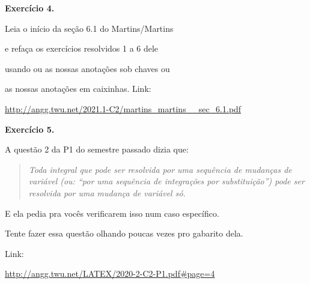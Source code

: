 \documentclass[oneside,12pt]{article}
\begin{document}
\bsk
\bsk


{\bf Exercício 4.}

Leia o início da seção 6.1 do Martins/Martins

e refaça os exercícios resolvidos 1 a 6 dele

usando ou as nossas anotações sob chaves ou

as nossas anotações em caixinhas. Link:

\ssk

{\scriptsize

\url{http://angg.twu.net/2021.1-C2/martins_martins__sec_6.1.pdf}

}


\newpage


{\bf Exercício 5.}

\msk

A questão 2 da P1 do semestre passado dizia que:
%
\begin{quote}
{\sl Toda integral que pode ser resolvida por uma sequência de
  mudanças de variável (ou: ``por uma sequência de integrações por
  substituição'') pode ser resolvida por uma mudança de variável só.}
\end{quote}

E ela pedia pra vocês verificarem isso num caso específico.

Tente fazer essa questão olhando poucas vezes pro gabarito dela.

Link:

\ssk

{\footnotesize

\url{http://angg.twu.net/LATEX/2020-2-C2-P1.pdf#page=4}

}
\end{document}
